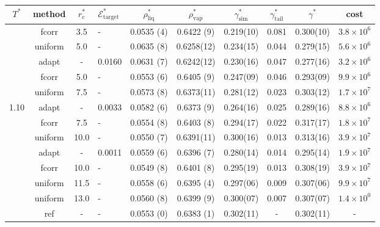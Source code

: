 \documentclass[aps,pre,preprint]{revtex4}
\begin{document}
\begin{table}
  \centering
  \begin{tabular*}{0.99\textwidth}{c|c|@{\extracolsep{\fill}}clcccccc}\hline\hline
    $T^\ast$ & \textrm{method} &$r^\ast_{c}$ & $\mathcal E^\ast_{\textrm{target}}$  & $\rho^\ast_{\textrm{liq}}$ & $\rho^\ast_{\textrm{vap}}$ & $\gamma^\ast_{\textrm{sim}}$ & $\gamma^\ast_{\textrm{tail}}$ & $\gamma^\ast$ & cost\\\hline
    & \textrm{fcorr}  & 3.5     & -       & 0.0535 (4) & 0.6422 (9) & 0.219(10) & 0.081 & 0.300(10) & $3.8\times 10^6$\\\cline{2-10}
    & \textrm{uniform}& 5.0     & -       & 0.0635 (8) & 0.6258(12) & 0.234(15) & 0.044 & 0.279(15) & $5.6\times 10^6$\\
    & \textrm{adapt}  & -       & 0.0160  & 0.0631 (7) & 0.6242(12) & 0.230(16) & 0.047 & 0.277(16) & $3.2\times 10^6$\\
    & \textrm{fcorr}  & 5.0     & -       & 0.0553 (6) & 0.6405 (9) & 0.247(09) & 0.046 & 0.293(09) & $9.9\times 10^6$\\\cline{2-10}
    & \textrm{uniform}& 7.5     & -       & 0.0573 (8) & 0.6373(11) & 0.281(12) & 0.023 & 0.303(12) & $1.7\times 10^7$\\
1.10& \textrm{adapt}  & -       & 0.0033  & 0.0582 (6) & 0.6373 (9) & 0.264(16) & 0.025 & 0.289(16) & $8.8\times 10^6$\\
    & \textrm{fcorr}  & 7.5     & -       & 0.0554 (8) & 0.6403 (8) & 0.294(17) & 0.022 & 0.317(17) & $1.8\times 10^7$\\\cline{2-10}
    & \textrm{uniform}& 10.0    & -       & 0.0550 (7) & 0.6391(11) & 0.300(16) & 0.013 & 0.313(16) & $3.9\times 10^7$\\
    & \textrm{adapt}  & -       & 0.0011  & 0.0559 (6) & 0.6396 (7) & 0.280(14) & 0.014 & 0.295(14) & $1.9\times 10^7$\\
    & \textrm{fcorr}  & 10.0    & -       & 0.0549 (8) & 0.6401 (8) & 0.295(19) & 0.013 & 0.308(19) & $3.9\times 10^7$\\\cline{2-10}
    & \textrm{uniform}& 11.5    & -       & 0.0558 (6) & 0.6395 (4) & 0.297(06) & 0.009 & 0.307(06) & $9.9\times 10^7$\\
    & \textrm{uniform}& 13.0    & -       & 0.0560 (8) & 0.6399 (9) & 0.300(07) & 0.007 & 0.307(07) & $1.4\times 10^0$\\\cline{2-10}
    & \textrm{ref}    & -       & -       & 0.0553 (0) & 0.6383 (1) & 0.302(11) & -     & 0.302(11) & - \\    \hline\hline

\end{tabular*}
\end{table}
\end{document}
